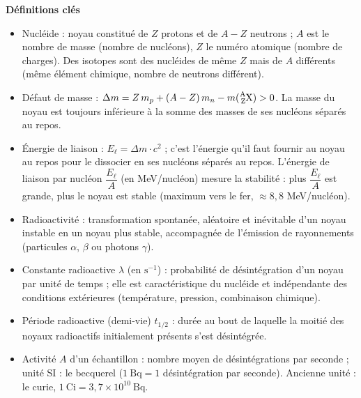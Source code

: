 \documentclass[11pt]{article}
\newcommand{\cle}[1]{{\popxbold\color{popdark}#1}}
\begin{document}
\begin{aretenir}
\textbf{Définitions clés}
\begin{itemize}
  \item \cle{Nucléide}  : noyau constitué de $Z$ protons et de $A - Z$ neutrons ; $A$ est le nombre de masse (nombre de nucléons), $Z$ le numéro atomique (nombre de charges). Des \cle{isotopes} sont des nucléides de même $Z$ mais de $A$ différents (même élément chimique, nombre de neutrons différent).
  \item \cle{Défaut de masse} : $\Delta m = Z\,m_p + (A-Z)\,m_n - m(\ce{^{A}_{Z}X}) > 0$. La masse du noyau est toujours inférieure à la somme des masses de ses nucléons séparés au repos.
  \item \cle{Énergie de liaison} : $E_\ell = \Delta m \cdot c^2$ ; c'est l'énergie qu'il faut fournir au noyau au repos pour le dissocier en ses nucléons séparés au repos. L'énergie de liaison par nucléon $\dfrac{E_\ell}{A}$ (en MeV/nucléon) mesure la stabilité : plus $\dfrac{E_\ell}{A}$ est grande, plus le noyau est stable (maximum vers le fer, $\approx 8{,}8$ MeV/nucléon).
  \item \cle{Radioactivité} : transformation spontanée, aléatoire et inévitable d'un noyau instable en un noyau plus stable, accompagnée de l'émission de rayonnements (particules $\alpha$, $\beta$ ou photons $\gamma$).
  \item \cle{Constante radioactive} $\lambda$ (en $\mathrm{s}^{-1}$) : probabilité de désintégration d'un noyau par unité de temps ; elle est caractéristique du nucléide et indépendante des conditions extérieures (température, pression, combinaison chimique).
  \item \cle{Période radioactive (demi-vie)} $t_{1/2}$ : durée au bout de laquelle la moitié des noyaux radioactifs initialement présents s'est désintégrée.
  \item \cle{Activité} $A$ d'un échantillon : nombre moyen de désintégrations par seconde ; unité SI : le becquerel ($1~\mathrm{Bq} = 1$ désintégration par seconde). Ancienne unité : le curie, $1~\mathrm{Ci} = 3{,}7 \times 10^{10}~\mathrm{Bq}$.
\end{itemize}


\end{aretenir}
\end{document}
